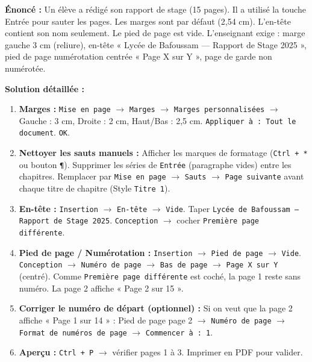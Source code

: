 \documentclass[11pt]{article}
\begin{document}
\begin{exoresolu}
    \textbf{Énoncé :} Un élève a rédigé son rapport de stage (15 pages). Il a utilisé la touche Entrée pour sauter les pages. Les marges sont par défaut (2,54 cm). L'en-tête contient son nom seulement. Le pied de page est vide. L'enseignant exige : marge gauche 3 cm (reliure), en-tête « Lycée de Bafoussam — Rapport de Stage 2025 », pied de page numérotation centrée « Page X sur Y », page de garde non numérotée.
    
    \textbf{Solution détaillée :}
    \begin{enumerate}
        \item \textbf{Marges :} \texttt{Mise en page} $\rightarrow$ \texttt{Marges} $\rightarrow$ \texttt{Marges personnalisées} $\rightarrow$ Gauche : 3 cm, Droite : 2 cm, Haut/Bas : 2,5 cm. \texttt{Appliquer à : Tout le document}. \texttt{OK}.
        \item \textbf{Nettoyer les sauts manuels :} Afficher les marques de formatage (\texttt{Ctrl + *} ou bouton \texttt{¶}). Supprimer les séries de \texttt{Entrée} (paragraphe vides) entre les chapitres. Remplacer par \texttt{Mise en page} $\rightarrow$ \texttt{Sauts} $\rightarrow$ \texttt{Page suivante} avant chaque titre de chapitre (Style \texttt{Titre 1}).
        \item \textbf{En-tête :} \texttt{Insertion} $\rightarrow$ \texttt{En-tête} $\rightarrow$ \texttt{Vide}. Taper \texttt{Lycée de Bafoussam — Rapport de Stage 2025}. \texttt{Conception} $\rightarrow$ cocher \texttt{Première page différente}.
        \item \textbf{Pied de page / Numérotation :} \texttt{Insertion} $\rightarrow$ \texttt{Pied de page} $\rightarrow$ \texttt{Vide}. \texttt{Conception} $\rightarrow$ \texttt{Numéro de page} $\rightarrow$ \texttt{Bas de page} $\rightarrow$ \texttt{Page X sur Y} (centré). Comme \texttt{Première page différente} est coché, la page 1 reste sans numéro. La page 2 affiche « Page 2 sur 15 ».
        \item \textbf{Corriger le numéro de départ (optionnel) :} Si on veut que la page 2 affiche « Page 1 sur 14 » : Pied de page page 2 $\rightarrow$ \texttt{Numéro de page} $\rightarrow$ \texttt{Format de numéros de page} $\rightarrow$ \texttt{Commencer à : 1}.
        \item \textbf{Aperçu :} \texttt{Ctrl + P} $\rightarrow$ vérifier pages 1 à 3. Imprimer en PDF pour valider.
    \end{enumerate}
\end{exoresolu}
\end{document}
